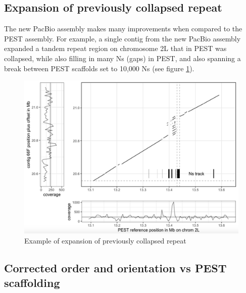 \subsection{Expansion of previously collapsed repeat}

\par{
The new PacBio assembly makes many improvements when compared to the PEST assembly. For example, a single contig from the new PacBio assembly expanded a tandem repeat region on chromosome 2L that in PEST was collapsed, while also filling in many Ns (gaps) in PEST, and also spanning a break between PEST scaffolds set to 10,000 Ns (see figure \ref{figure:repeat}).
}

\begin{figure}[htbp!]

\caption{Example of expansion of previously collapsed repeat}
\label{figure:repeat}
\begin{centering}
\includegraphics[width=1.0\textwidth]{repeatexpansion.png}
\end{centering}

\end{figure}

\subsection{Corrected order and orientation vs PEST scaffolding}

